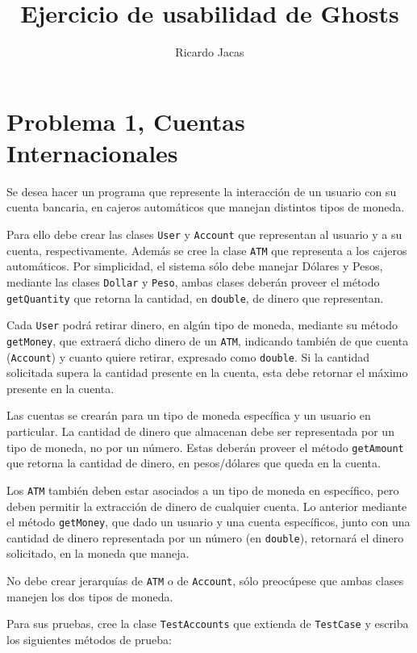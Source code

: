 \documentclass[11pt,spanish,letterpaper]{report}
\title{Ejercicio de usabilidad de Ghosts}
\author{Ricardo Jacas}
\begin{document}
\maketitle

\section*{Problema 1, Cuentas Internacionales}

Se desea hacer un programa que represente la interacción de un usuario con su cuenta bancaria, en cajeros automáticos que manejan distintos tipos de moneda.

Para ello debe crear las clases {\tt User} y {\tt Account} que representan al usuario y a su cuenta, respectivamente. Además se cree la clase {\tt ATM} que representa a los cajeros automáticos. Por simplicidad, el sistema sólo debe manejar Dólares y Pesos, mediante las clases {\tt Dollar} y {\tt Peso}, ambas clases deberán proveer  el método {\tt getQuantity} que retorna la cantidad, en {\tt double}, de dinero que representan.

Cada {\tt User} podrá retirar dinero, en algún tipo de moneda, mediante su método {\tt getMoney}, que extraerá dicho dinero de un {\tt ATM}, indicando también de que cuenta ({\tt Account}) y cuanto quiere retirar, expresado como {\tt double}. Si la cantidad solicitada supera la cantidad presente en la cuenta, esta debe retornar el máximo presente en la cuenta.

Las cuentas se crearán para un tipo de moneda específica y un usuario en particular. La cantidad de dinero que almacenan debe ser representada por un tipo de moneda, no por un número. Estas deberán proveer el método {\tt getAmount} que retorna la cantidad de dinero, en pesos/dólares que queda en la cuenta. 

Los {\tt ATM} también deben estar asociados a un tipo de moneda en específico, pero deben permitir la extracción de dinero de cualquier cuenta. Lo anterior mediante el método {\tt getMoney}, que dado un usuario y una cuenta específicos, junto con una cantidad de dinero representada por un número (en  {\tt double}), retornará el dinero solicitado, en la moneda que maneja.

No debe crear jerarquías de {\tt ATM} o de {\tt Account}, sólo preocúpese que ambas clases manejen los dos tipos de moneda.


Para sus pruebas, cree la clase {\tt TestAccounts} que extienda de {\tt TestCase} y escriba los siguientes métodos de prueba:
\end{document}
